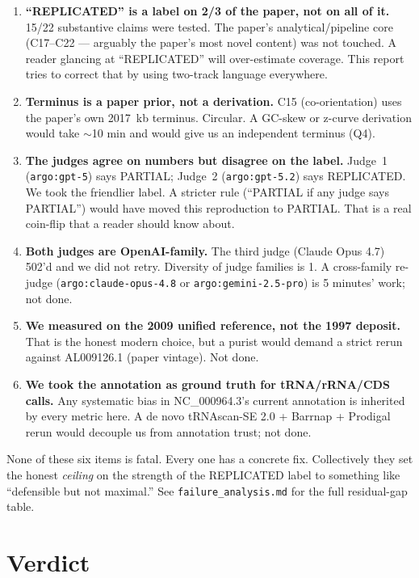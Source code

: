 \documentclass[11pt,letterpaper]{article}
\begin{document}
\begin{enumerate}[nosep,leftmargin=1.5em]
\item \textbf{``REPLICATED'' is a label on 2/3 of the paper, not on all of it.} 15/22 substantive claims were tested. The paper's analytical/pipeline core (C17--C22 --- arguably the paper's most novel content) was not touched. A reader glancing at ``REPLICATED'' will over-estimate coverage. This report tries to correct that by using two-track language everywhere.
\item \textbf{Terminus is a paper prior, not a derivation.} C15 (co-orientation) uses the paper's own \SI{2017}{kb} terminus. Circular. A GC-skew or z-curve derivation would take $\sim$10 min and would give us an independent terminus (Q4).
\item \textbf{The judges agree on numbers but disagree on the label.} Judge~1 (\texttt{argo:gpt-5}) says PARTIAL; Judge~2 (\texttt{argo:gpt-5.2}) says REPLICATED. We took the friendlier label. A stricter rule (``PARTIAL if any judge says PARTIAL'') would have moved this reproduction to PARTIAL. That is a real coin-flip that a reader should know about.
\item \textbf{Both judges are OpenAI-family.} The third judge (Claude Opus 4.7) 502'd and we did not retry. Diversity of judge families is 1. A cross-family re-judge (\texttt{argo:claude-opus-4.8} or \texttt{argo:gemini-2.5-pro}) is 5 minutes' work; not done.
\item \textbf{We measured on the 2009 unified reference, not the 1997 deposit.} That is the honest modern choice, but a purist would demand a strict rerun against AL009126.1 (paper vintage). Not done.
\item \textbf{We took the annotation as ground truth for tRNA/rRNA/CDS calls.} Any systematic bias in NC\_000964.3's current annotation is inherited by every metric here. A de novo tRNAscan-SE 2.0 + Barrnap + Prodigal rerun would decouple us from annotation trust; not done.
\end{enumerate}

None of these six items is fatal. Every one has a concrete fix. Collectively they set the honest \emph{ceiling} on the strength of the REPLICATED label to something like ``defensible but not maximal.'' See \texttt{failure\_analysis.md} for the full residual-gap table.

\section{Verdict}
\end{document}
